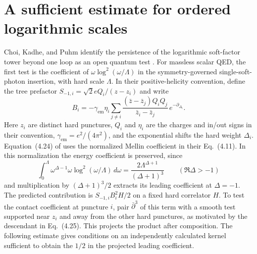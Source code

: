\section{A sufficient estimate for ordered logarithmic scales}
\label{sec:orderedscales}

Choi, Kadhe, and Puhm identify the persistence of the logarithmic
soft-factor tower beyond one loop as an open quantum test
\cite[Sec.~6]{longrange}. For massless scalar QED, the first test is
the coefficient of $\omega\log^2(\omega/\Lambda)$ in the
symmetry-governed single-soft-photon insertion, with hard scale
$\Lambda$. In their positive-helicity convention, define the
tree prefactor $S_{-1,i}=\sqrt{2}eQ_i/(z-z_i)$ and write
\[
 B_i=-\gamma_{\mathrm{em}}\eta_i
       \sum_{j\ne i}\frac{(\bar z-\bar z_j)Q_iQ_j}
                          {\bar z_i-\bar z_j}\,
         e^{-\partial_{\Delta_i}} .
\]
Here $z_i$ are distinct hard punctures, $Q_i$ and $\eta_i$ are
the charges and in/out signs in their convention,
$\gamma_{\mathrm{em}}=e^2/(4\pi^2)$, and the exponential
shifts the hard weight $\Delta_i$. Equation~(4.24) of
\cite{longrange} uses the normalized Mellin coefficient
in their Eq.~(4.11). In this normalization the energy
coefficient is preserved, since
\[
 \int_0^\Lambda \omega^{\Delta-1}\omega\log^2(\omega/\Lambda)\,d\omega
 =\frac{2\Lambda^{\Delta+1}}{(\Delta+1)^3}
 \qquad(\Re\Delta>-1)
\]
and multiplication by $(\Delta+1)^3/2$ extracts its leading
coefficient at $\Delta=-1$. The predicted contribution is
$S_{-1,i}B_i^2H/2$ on a fixed hard correlator $H$. To test
the contact coefficient at
puncture $i$, pair $\bar\partial^3$ of this term with a smooth
test supported near $z_i$ and away from the other hard punctures,
as motivated by the descendant in Eq.~(4.25). This projects the
product after composition. The following estimate gives
conditions on an independently calculated kernel sufficient
to obtain the $1/2$ in the projected leading coefficient.

